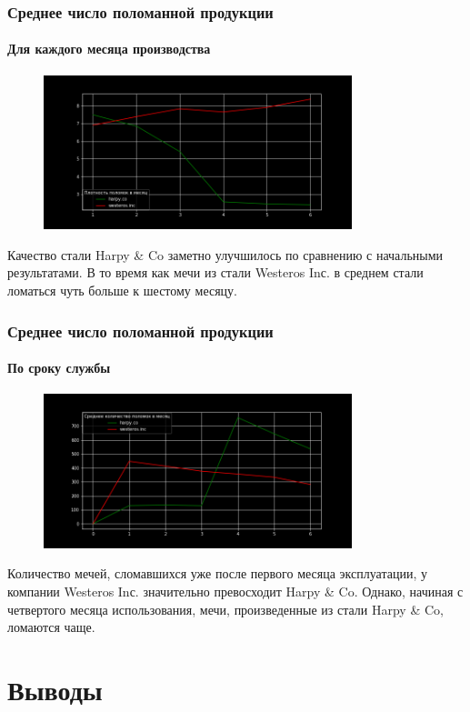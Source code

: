 \documentclass[10pt,pdf,hyperref={unicode}]{beamer}
\begin{document}
\begin{frame}
\frametitle{Среднее число поломанной продукции}
\framesubtitle{Для каждого месяца производства}
\begin{figure}[t]
    \centering
    \includegraphics[width=0.8\textwidth]{4.png}
\end{figure}
Качество стали Harpy \& Co заметно улучшилось по сравнению с начальными результатами. В то время как мечи из стали Westeros Inс. в среднем стали ломаться чуть больше к шестому месяцу.
\end{frame}

\begin{frame}
\frametitle{Среднее число поломанной продукции}
\framesubtitle{По сроку службы}
\begin{figure}[t]
    \centering
    \includegraphics[width=0.8\textwidth]{1.png}
\end{figure}
Количество мечей, сломавшихся уже после первого месяца эксплуатации, у компании Westeros Inс. значительно превосходит Harpy \& Co. Однако, начиная с четвертого месяца использования, мечи, произведенные из стали Harpy \& Co, ломаются чаще.
\end{frame}
\section{Выводы}
\end{document}
